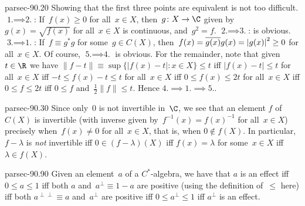 \documentclass[b5page]{book}
\begin{document}
\begin{solution}{parsec-90.20}
Showing that the first three points are equivalent is not too difficult.
$\text{1.}\implies\text{2.}$:
    If~$f(x)\geq 0$ for all~$x\in X$,
    then~$g\colon X\to\C$ given by~$g(x)=\sqrt{f(x)}$
    for all~$x\in X$ is continuous,
    and~$g^2=f$.
$\text{2.}\implies\text{3.}$:
is obvious.
$\text{3.}\implies\text{1.}$:
If~$f\equiv g^*g$ for some~$g\in C(X)$,
    then~$f(x)=\smash{\overline{g(x)}}g(x)=\left|g(x)\right|^2\geq 0$
    for all~$x\in X$.
Of course,
$\text{5.}\implies \text{4.}$ is obvious.
For the remainder,
note that given~$t\in \R$ we have
    $\|f-t\|\equiv \sup\{\left|f(x)-t\right|\colon x\in X\}\leq t$
    iff $\left|f(x)-t\right|\leq t$ for all~$x\in X$
    iff $-t\leq f(x)-t \leq t $ for all~$x\in X$
    iff $0\leq f(x)\leq 2t$ for all~$x\in X$
    iff $0\leq f\leq 2t$
    iff $0\leq f$ and~$\frac{1}{2}\|f\|\leq t$.
Hence $\text{4.}\implies\text{1.}\implies\text{5.}$.
\end{solution}
\begin{solution}{parsec-90.30}
Since only~$0$ is not invertible in~$\C$,
    we see that an element $f$ of $C(X)$
    is invertible (with inverse given by~$f^{-1}(x)=f(x)^{-1}$ 
    for all~$x\in X$) precisely when~$f(x)\neq 0$ for all~$x\in X$,
    that is, when $0\notin f(X)$.
In particular,
    $f-\lambda $ is \emph{not} invertible
    iff $0\in (f-\lambda)(X)$
    iff $f(x)=\lambda$ for some~$x\in X$
    iff $\lambda \in f(X)$.
\end{solution}
\begin{solution}{parsec-90.90}
Given an element~$a$ of a $C^*$-algebra,
we have that
    $a$ is an effect iff $0\leq a\leq 1$
    iff both $a$ and~$a^\perp \equiv 1-a$ 
    are positive (using the definition of~$\leq$ here)
    iff both $a^{\perp\perp}\equiv a$ and~$a^\perp$ are positive
    iff $0\leq a^\perp\leq 1$
    iff $a^\perp$ is an effect.
\end{solution}
\end{document}
